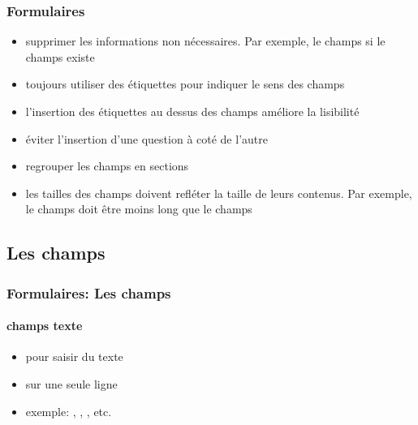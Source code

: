 \documentclass[xcolor=table]{beamer}
\begin{document}
\begin{frame}
\frametitle{Formulaires}

\begin{itemize}
	\item supprimer les informations non nécessaires. Par exemple, le champs  si le champs  existe
	\item toujours utiliser des étiquettes pour indiquer le sens des champs
	\item l'insertion des étiquettes au dessus des champs améliore la lisibilité
	\item éviter l'insertion d'une question à coté de l'autre
	\item regrouper les champs en sections 
	\item les tailles des champs doivent refléter la taille de leurs contenus. Par exemple, le champs  doit être moins long que le champs 
\end{itemize}

\end{frame}

\subsection{Les champs}

%
%

\begin{frame}
\frametitle{Formulaires: Les champs}
\framesubtitle{champs texte}

\begin{minipage}{0.69\textwidth}
	\begin{itemize}
		\item pour saisir du texte
		\item sur une seule ligne 
		\item exemple: , , , etc.
	\end{itemize}
\end{minipage}
\begin{minipage}{0.3\textwidth}
\end{minipage}

\end{frame}
\end{document}
